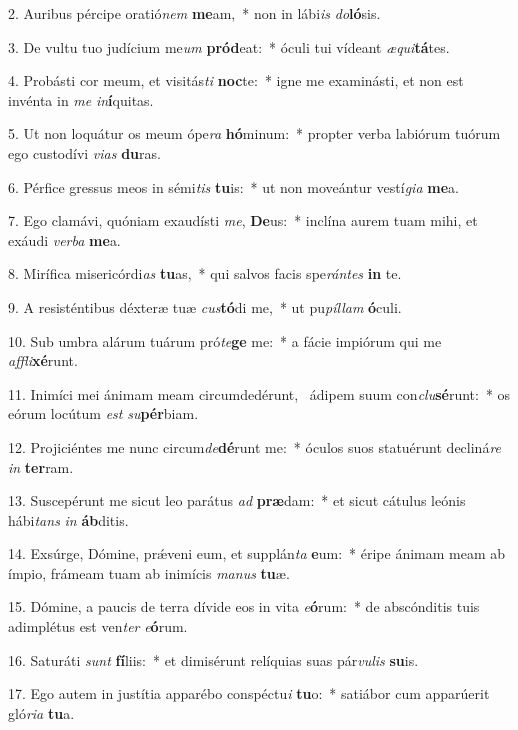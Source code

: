2. Auribus pércipe oratió\textit{nem} \textbf{me}am,~*  non in lábi\textit{is} \textit{do}\textbf{ló}sis.\

3. De vultu tuo judícium me\textit{um} \textbf{pród}eat:~*  óculi tui vídeant \textit{æ}\textit{qui}\textbf{tá}tes.\

4. Probásti cor meum, et visitás\textit{ti} \textbf{noc}te:~*  igne me examinásti, et non est invénta in \textit{me} \textit{in}\textbf{í}quitas.\

5. Ut non loquátur os meum ópe\textit{ra} \textbf{hó}minum:~*  propter verba labiórum tuórum ego custodívi \textit{vi}\textit{as} \textbf{du}ras.\

6. Pérfice gressus meos in sémi\textit{tis} \textbf{tu}is:~*  ut non moveántur vestí\textit{gi}\textit{a} \textbf{me}a.\

7. Ego clamávi, quóniam exaudísti \textit{me}, \textbf{De}us:~*  inclína aurem tuam mihi, et exáudi \textit{ver}\textit{ba} \textbf{me}a.\

8. Mirífica misericórdi\textit{as} \textbf{tu}as,~*  qui salvos facis spe\textit{rán}\textit{tes} \textbf{in} te.\

9. A resisténtibus déxteræ tuæ \textit{cus}\textbf{tó}di me,~*  ut pu\textit{píl}\textit{lam} \textbf{ó}culi.\

10. Sub umbra alárum tuárum pró\textit{te}\textbf{ge} me:~*  a fácie impiórum qui me \textit{af}\textit{fli}\textbf{xé}runt.\

11. Inimíci mei ánimam meam circumdedérunt, \dag\  ádipem suum con\textit{clu}\textbf{sé}runt:~*  os eórum locútum \textit{est} \textit{su}\textbf{pér}biam.\

12. Projiciéntes me nunc circum\textit{de}\textbf{dé}runt me:~*  óculos suos statuérunt decliná\textit{re} \textit{in} \textbf{ter}ram.\

13. Suscepérunt me sicut leo parátus \textit{ad} \textbf{præ}dam:~*  et sicut cátulus leónis hábi\textit{tans} \textit{in} \textbf{áb}ditis.\

14. Exsúrge, Dómine, prǽveni eum, et supplán\textit{ta} \textbf{e}um:~*  éripe ánimam meam ab ímpio, frámeam tuam ab inimícis \textit{ma}\textit{nus} \textbf{tu}æ.\

15. Dómine, a paucis de terra dívide eos in vita \textit{e}\textbf{ó}rum:~*  de abscónditis tuis adimplétus est ven\textit{ter} \textit{e}\textbf{ó}rum.\

16. Saturáti \textit{sunt} \textbf{fí}liis:~*  et dimisérunt relíquias suas pár\textit{vu}\textit{lis} \textbf{su}is.\

17. Ego autem in justítia apparébo conspéctu\textit{i} \textbf{tu}o:~*  satiábor cum apparúerit gló\textit{ri}\textit{a} \textbf{tu}a.\

